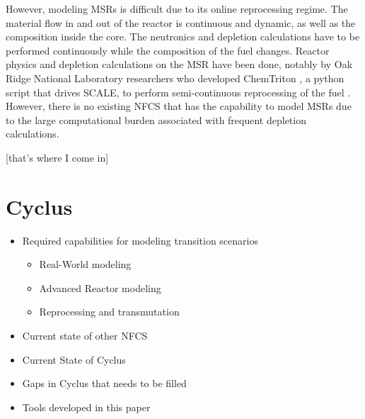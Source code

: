 However, modeling \glspl{MSR} is difficult due to its online reprocessing regime.
The material flow in and out of the reactor is continuous and dynamic, as well as the
composition inside the core.
The neutronics and depletion calculations have to be performed continuously while
the composition of the fuel changes. Reactor physics and depletion calculations
on the \gls{MSR} have been done, notably by 
 Oak Ridge National Laboratory researchers who developed
ChemTriton \cite{powers_new_2013}, a python script that drives SCALE,
to perform semi-continuous reprocessing of the fuel \cite{powers_inventory_2014, betzler_fuel_2018}.
However, there is no existing \gls{NFCS} that has the capability to model \glspl{MSR}
due to the large computational burden associated with frequent depletion calculations.

[that's where I come in]





\section{Cyclus}




\begin{itemize}
	\item Required capabilities for modeling transition scenarios
	\begin{itemize}
		\item Real-World modeling
		\item Advanced Reactor modeling
		\item Reprocessing and transmutation
	\end{itemize}
	\item Current state of other \gls{NFCS}
	\item Current State of Cyclus
	\item Gaps in Cyclus that needs to be filled
	\item Tools developed in this paper
\end{itemize}